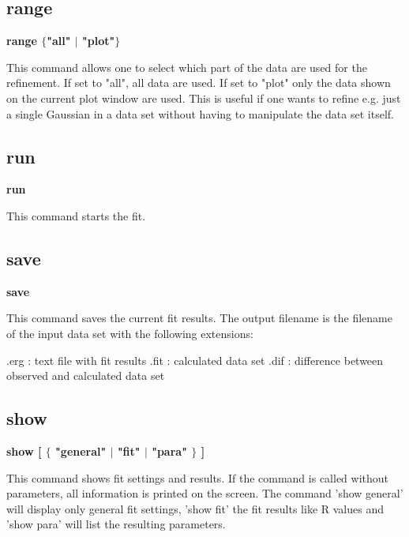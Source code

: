 \subsection*{range}
{\bf range $ \{$"all" $| $ "plot"$\} $ \par }
\par
\vspace{3pt}
This command allows one to select which part of the data are used 
for the refinement. If set to "all", all data are used. If set to 
"plot" only the data shown on the current plot window are used. 
This is useful if one wants to refine e.g. just a single Gaussian 
in a data set without having to manipulate the data set itself. 
\subsection*{run}
{\bf run \par }
\par
\vspace{3pt}
This command starts the fit. 
\subsection*{save}
{\bf save \par }
\par
\vspace{3pt}
This command saves the current fit results. The output filename 
is the filename of the input data set with the following extensions: 
\par
\begin{MacVerbatim}
  .erg  : text file with fit results
  .fit  : calculated data set
  .dif  : difference between observed and calculated data set
\end{MacVerbatim}
\subsection*{show}
{\bf show [ $ \{$ "general" $| $ "fit" $| $ "para" $\} $ ] \par }
\par
\vspace{3pt}
This command shows fit settings and results. If the command is called 
without parameters, all information is printed on the screen. The 
command 'show general' will display only general fit settings, 'show 
fit' the fit results like R values and 'show para' will list the 
resulting parameters. 
